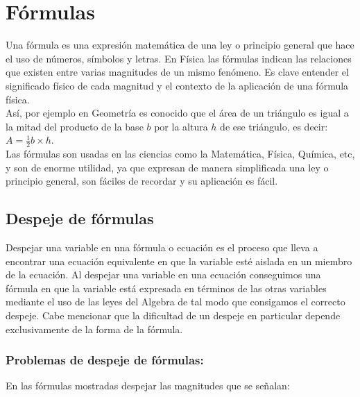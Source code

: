 \documentclass[a5paper,pagesize,10pt,bibtotoc,pointlessnumbers,
normalheadings,DIV=9,fleqn,x11names,table,twoside=false]{scrbook}
\begin{document}
\section{Fórmulas}

Una fórmula es una expresión matemática de una ley o principio general que hace el uso de números, símbolos y letras. En Física 
las fórmulas indican las relaciones que existen entre varias magnitudes de un mismo fenómeno. Es clave entender el significado 
físico de cada magnitud y el contexto de la aplicación de una fórmula física.\\

Así, por ejemplo en Geometría es conocido que el área de un triángulo es igual a la mitad del producto de la base $b$ por la 
altura $h$ de ese triángulo, es decir: $A = \frac{1}{2}b\times h$.\\

Las fórmulas son usadas en las ciencias como la Matemática, Física, Química, etc, y son de enorme utilidad, ya que expresan de 
manera simplificada una ley o principio general, son fáciles de recordar y su aplicación es fácil.

\subsection{Despeje de fórmulas}

Despejar una variable en una fórmula o ecuación es el proceso que lleva a encontrar una ecuación equivalente en que la variable 
esté aislada en un miembro de la ecuación. Al despejar una variable en una ecuación conseguimos una fórmula en que la variable 
está expresada en términos de las otras variables mediante el uso de las leyes del Algebra de tal modo que consigamos el correcto 
despeje. Cabe mencionar que la dificultad de un despeje en particular depende exclusivamente de la forma de la fórmula.  


\subsubsection{Problemas de despeje de fórmulas:}

En las fórmulas mostradas despejar las magnitudes que se señalan:
\end{document}
